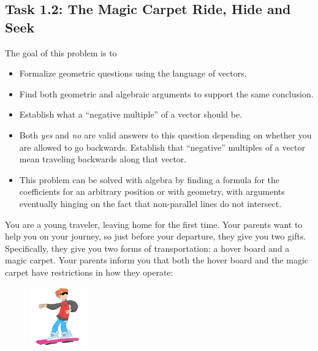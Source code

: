 \documentclass{problemset}
\begin{document}
\begin{iola}
\section*{Task 1.2: The Magic Carpet Ride, Hide and Seek}


\begin{annotation}
	\begin{goals}

		The goal of this problem is to
		\begin{itemize}
			\item Formalize geometric questions using the language of vectors.
			\item Find both geometric and algebraic arguments to support the same
				conclusion.
			\item Establish what a ``negative multiple'' of a vector should be.
		\end{itemize}
	\end{goals}
	\begin{notes}
		\begin{itemize}
			\item Both \emph{yes} and \emph{no} are valid answers to
				this question depending on whether you are allowed
				to go backwards. Establish that ``negative'' multiples of
				a vector mean traveling backwards along that vector.
			\item This problem can be solved with algebra by finding a formula
				for the coefficients for an arbitrary position or with geometry,
				with arguments eventually hinging on the fact that non-parallel
				lines do not intersect.
		\end{itemize}
	\end{notes}
\end{annotation}
You are a young traveler, leaving home for the first time. Your parents
want to help you on your journey, so just before your departure, they give
you two gifts. Specifically, they give you two forms of transportation:
a hover board and a magic carpet. Your parents inform you that both the
hover board and the magic carpet have restrictions in how they operate:



\begin{minipage}{\textwidth}
	\vspace{.5cm}
	\begin{figure}
	\vspace{-.8cm}
	\includegraphics[width=1in]{images/HoverBoard-small.png}
	\end{figure}


\end{minipage}
\end{iola}
\end{document}
